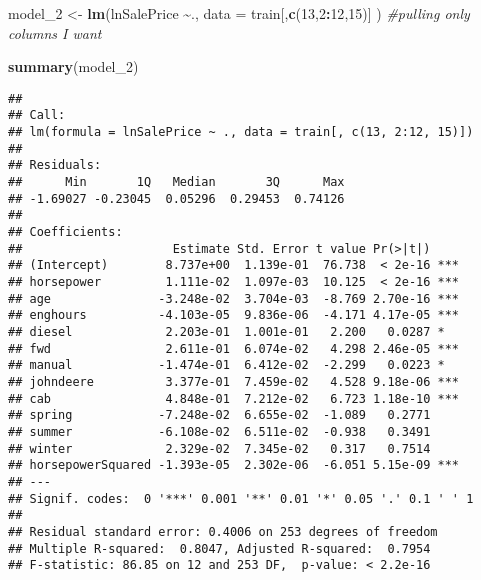 \documentclass[
]{article}
\newenvironment{Shaded}{\begin{snugshade}}{\end{snugshade}}
\newcommand{\AttributeTok}[1]{\textcolor[rgb]{0.13,0.29,0.53}{#1}}
\newcommand{\CommentTok}[1]{\textcolor[rgb]{0.56,0.35,0.01}{\textit{#1}}}
\newcommand{\DecValTok}[1]{\textcolor[rgb]{0.00,0.00,0.81}{#1}}
\newcommand{\FunctionTok}[1]{\textcolor[rgb]{0.13,0.29,0.53}{\textbf{#1}}}
\newcommand{\NormalTok}[1]{#1}
\newcommand{\OtherTok}[1]{\textcolor[rgb]{0.56,0.35,0.01}{#1}}
\newcommand{\SpecialCharTok}[1]{\textcolor[rgb]{0.81,0.36,0.00}{\textbf{#1}}}
\newcommand{\StringTok}[1]{\textcolor[rgb]{0.31,0.60,0.02}{#1}}
\begin{document}
\begin{Shaded}
\begin{Highlighting}[]
\NormalTok{model\_2 }\OtherTok{\textless{}{-}} \FunctionTok{lm}\NormalTok{(lnSalePrice }\SpecialCharTok{\textasciitilde{}}\NormalTok{., }\AttributeTok{data =}\NormalTok{ train[,}\FunctionTok{c}\NormalTok{(}\DecValTok{13}\NormalTok{,}\DecValTok{2}\SpecialCharTok{:}\DecValTok{12}\NormalTok{,}\DecValTok{15}\NormalTok{)] ) }\CommentTok{\#pulling only columns I want}

\FunctionTok{summary}\NormalTok{(model\_2)}
\end{Highlighting}
\end{Shaded}

\begin{verbatim}
## 
## Call:
## lm(formula = lnSalePrice ~ ., data = train[, c(13, 2:12, 15)])
## 
## Residuals:
##      Min       1Q   Median       3Q      Max 
## -1.69027 -0.23045  0.05296  0.29453  0.74126 
## 
## Coefficients:
##                     Estimate Std. Error t value Pr(>|t|)    
## (Intercept)        8.737e+00  1.139e-01  76.738  < 2e-16 ***
## horsepower         1.111e-02  1.097e-03  10.125  < 2e-16 ***
## age               -3.248e-02  3.704e-03  -8.769 2.70e-16 ***
## enghours          -4.103e-05  9.836e-06  -4.171 4.17e-05 ***
## diesel             2.203e-01  1.001e-01   2.200   0.0287 *  
## fwd                2.611e-01  6.074e-02   4.298 2.46e-05 ***
## manual            -1.474e-01  6.412e-02  -2.299   0.0223 *  
## johndeere          3.377e-01  7.459e-02   4.528 9.18e-06 ***
## cab                4.848e-01  7.212e-02   6.723 1.18e-10 ***
## spring            -7.248e-02  6.655e-02  -1.089   0.2771    
## summer            -6.108e-02  6.511e-02  -0.938   0.3491    
## winter             2.329e-02  7.345e-02   0.317   0.7514    
## horsepowerSquared -1.393e-05  2.302e-06  -6.051 5.15e-09 ***
## ---
## Signif. codes:  0 '***' 0.001 '**' 0.01 '*' 0.05 '.' 0.1 ' ' 1
## 
## Residual standard error: 0.4006 on 253 degrees of freedom
## Multiple R-squared:  0.8047, Adjusted R-squared:  0.7954 
## F-statistic: 86.85 on 12 and 253 DF,  p-value: < 2.2e-16
\end{verbatim}

\begin{Shaded}
\end{Shaded}
\end{document}
